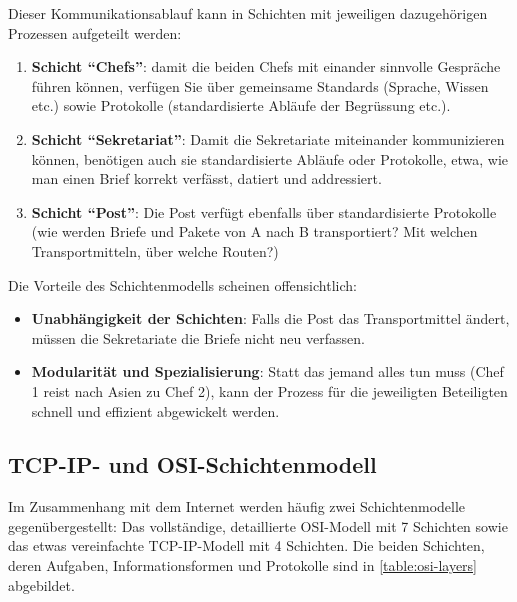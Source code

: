 Dieser Kommunikationsablauf kann in Schichten mit jeweiligen dazugehörigen Prozessen aufgeteilt werden:
\begin{enumerate}
	\item \textbf{Schicht ``Chefs''}: damit die beiden Chefs mit einander sinnvolle Gespräche führen können, verfügen Sie über gemeinsame Standards (Sprache, Wissen etc.) sowie Protokolle (standardisierte Abläufe der Begrüssung etc.).
	\item \textbf{Schicht ``Sekretariat''}: Damit die Sekretariate miteinander kommunizieren können, benötigen auch sie standardisierte Abläufe oder Protokolle, etwa, wie man einen Brief korrekt verfässt, datiert und addressiert.
	\item \textbf{Schicht ``Post''}: Die Post verfügt ebenfalls über standardisierte Protokolle (wie werden Briefe und Pakete von A nach B transportiert? Mit welchen Transportmitteln, über welche Routen?)
\end{enumerate}
Die Vorteile des Schichtenmodells scheinen offensichtlich:
\begin{itemize}
	\item \textbf{Unabhängigkeit der Schichten}: Falls die Post das Transportmittel ändert, müssen die Sekretariate die Briefe nicht neu verfassen.
	\item \textbf{Modularität und Spezialisierung}: Statt das jemand alles tun muss (Chef 1 reist nach Asien zu Chef 2), kann der Prozess für die jeweiligten Beteiligten schnell und effizient abgewickelt werden.
\end{itemize}

\subsection{TCP-IP- und OSI-Schichtenmodell}

Im Zusammenhang mit dem Internet werden häufig zwei Schichtenmodelle gegenübergestellt: Das vollständige, detaillierte \acrfull{OSI}-Modell mit 7 Schichten sowie das etwas vereinfachte \acrfull{TCP}-\acrfull{IP}-Modell mit 4 Schichten. Die beiden Schichten, deren Aufgaben, Informationsformen und Protokolle sind in \cref{table:osi-layers} abgebildet.


